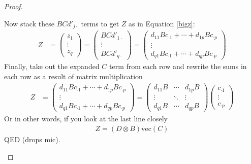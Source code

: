 \documentclass[12pt]{article}
\theoremstyle{plain}
\theoremstyle{definition}
\theoremstyle{remark}
\begin{document}
\begin{proof}
\begin{enumerate}[label=(\roman*)]
    Now stack these $BCd'_{j\cdot}$ terms
    to get $Z$ as in Equation \ref{bigz}:
    \begin{align}
        Z &= \begin{pmatrix} z_1 \\ \vdots \\ z_q
      \end{pmatrix} =
      \begin{pmatrix} BCd'_{1\cdot} \\ \vdots \\ BCd'_{q\cdot}
      \end{pmatrix}
        = \begin{pmatrix}
          d_{1 1} Bc_{\cdot 1} + \cdots
          +  d_{1 p}Bc_{\cdot p} \\
          \vdots \\
          d_{q 1} Bc_{\cdot 1} + \cdots
          +  d_{q p}Bc_{\cdot p}
      \end{pmatrix}
    \end{align}
    Finally, take out the expanded $C$ term from
    each row and rewrite the sums in each row
    as a result of matrix multiplication
    \begin{align}
        Z &=\begin{pmatrix}
          d_{1 1} Bc_{\cdot 1} + \cdots
          +  d_{1 p}Bc_{\cdot p} \\
          \vdots \\
          d_{q 1} Bc_{\cdot 1} + \cdots
          +  d_{q p}Bc_{\cdot p}
      \end{pmatrix}
        = \begin{pmatrix}
          d_{1 1} B & \cdots
          &  d_{1 p}B \\
          \vdots & \ddots & \vdots \\
          d_{q 1} B & \cdots
          &  d_{q p}B
      \end{pmatrix}
        \begin{pmatrix}
      c_{\cdot 1} \\ \vdots \\ c_{\cdot p}
        \end{pmatrix}
    \end{align}
    Or in other words, if you look at the
    last line closely
    \begin{align*}
        Z = (D\otimes B) \text{vec}(C)
    \end{align*}
    QED (drops mic).
    \end{enumerate}
\end{proof}
\end{document}
